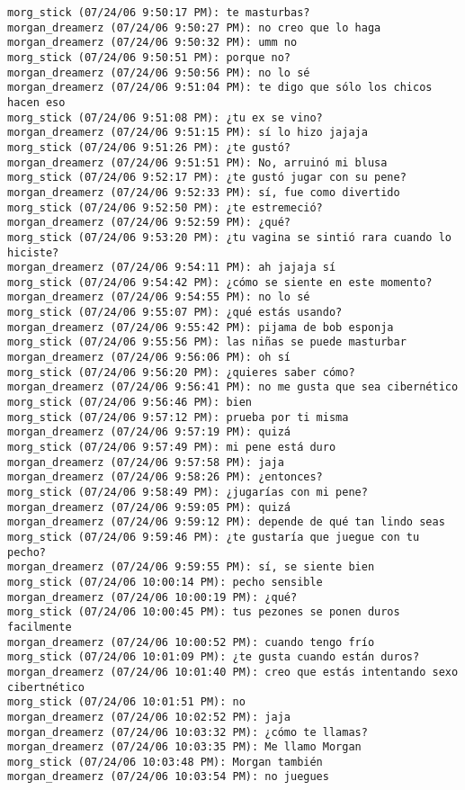 \begin{verbatim}
morg_stick (07/24/06 9:50:17 PM): te masturbas?
morgan_dreamerz (07/24/06 9:50:27 PM): no creo que lo haga
morgan_dreamerz (07/24/06 9:50:32 PM): umm no
morg_stick (07/24/06 9:50:51 PM): porque no?
morgan_dreamerz (07/24/06 9:50:56 PM): no lo sé
morgan_dreamerz (07/24/06 9:51:04 PM): te digo que sólo los chicos hacen eso
morg_stick (07/24/06 9:51:08 PM): ¿tu ex se vino?
morgan_dreamerz (07/24/06 9:51:15 PM): sí lo hizo jajaja
morg_stick (07/24/06 9:51:26 PM): ¿te gustó?
morgan_dreamerz (07/24/06 9:51:51 PM): No, arruinó mi blusa
morg_stick (07/24/06 9:52:17 PM): ¿te gustó jugar con su pene?
morgan_dreamerz (07/24/06 9:52:33 PM): sí, fue como divertido
morg_stick (07/24/06 9:52:50 PM): ¿te estremeció?
morgan_dreamerz (07/24/06 9:52:59 PM): ¿qué?
morg_stick (07/24/06 9:53:20 PM): ¿tu vagina se sintió rara cuando lo hiciste?
morgan_dreamerz (07/24/06 9:54:11 PM): ah jajaja sí
morg_stick (07/24/06 9:54:42 PM): ¿cómo se siente en este momento?
morgan_dreamerz (07/24/06 9:54:55 PM): no lo sé
morg_stick (07/24/06 9:55:07 PM): ¿qué estás usando?
morgan_dreamerz (07/24/06 9:55:42 PM): pijama de bob esponja
morg_stick (07/24/06 9:55:56 PM): las niñas se puede masturbar
morgan_dreamerz (07/24/06 9:56:06 PM): oh sí
morg_stick (07/24/06 9:56:20 PM): ¿quieres saber cómo?
morgan_dreamerz (07/24/06 9:56:41 PM): no me gusta que sea cibernético
morg_stick (07/24/06 9:56:46 PM): bien
morg_stick (07/24/06 9:57:12 PM): prueba por ti misma
morgan_dreamerz (07/24/06 9:57:19 PM): quizá
morg_stick (07/24/06 9:57:49 PM): mi pene está duro
morgan_dreamerz (07/24/06 9:57:58 PM): jaja
morgan_dreamerz (07/24/06 9:58:26 PM): ¿entonces?
morg_stick (07/24/06 9:58:49 PM): ¿jugarías con mi pene?
morgan_dreamerz (07/24/06 9:59:05 PM): quizá
morgan_dreamerz (07/24/06 9:59:12 PM): depende de qué tan lindo seas
morg_stick (07/24/06 9:59:46 PM): ¿te gustaría que juegue con tu pecho?
morgan_dreamerz (07/24/06 9:59:55 PM): sí, se siente bien
morg_stick (07/24/06 10:00:14 PM): pecho sensible
morgan_dreamerz (07/24/06 10:00:19 PM): ¿qué?
morg_stick (07/24/06 10:00:45 PM): tus pezones se ponen duros facilmente
morgan_dreamerz (07/24/06 10:00:52 PM): cuando tengo frío
morg_stick (07/24/06 10:01:09 PM): ¿te gusta cuando están duros?
morgan_dreamerz (07/24/06 10:01:40 PM): creo que estás intentando sexo cibertnético
morg_stick (07/24/06 10:01:51 PM): no
morgan_dreamerz (07/24/06 10:02:52 PM): jaja
morgan_dreamerz (07/24/06 10:03:32 PM): ¿cómo te llamas?
morgan_dreamerz (07/24/06 10:03:35 PM): Me llamo Morgan
morg_stick (07/24/06 10:03:48 PM): Morgan también
morgan_dreamerz (07/24/06 10:03:54 PM): no juegues

\end{verbatim}
